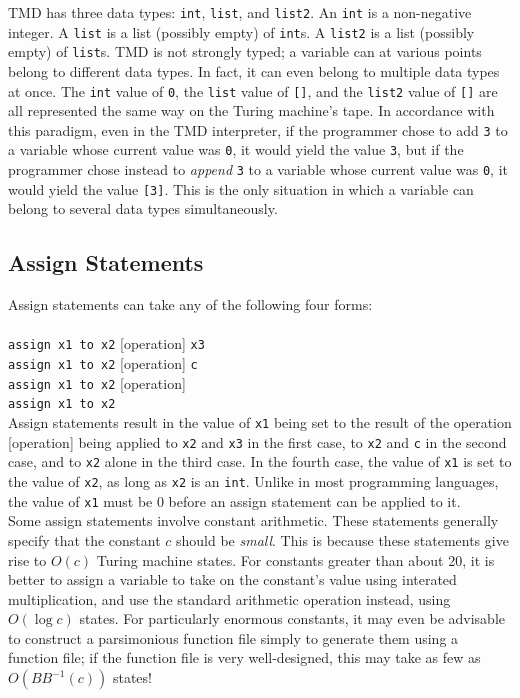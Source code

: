 TMD has three data types: \texttt{int}, \texttt{list}, and \texttt{list2}. An \texttt{int} is a non-negative integer. A \texttt{list} is a list (possibly empty) of \texttt{int}s. A \texttt{list2} is a list (possibly empty) of \texttt{list}s. TMD is not strongly typed; a variable can at various points belong to different data types. In fact, it can even belong to multiple data types at once. The \texttt{int} value of \texttt{0}, the \texttt{list} value of \texttt{[]}, and the \texttt{list2} value of \texttt{[]} are all represented the same way on the Turing machine's tape. In accordance with this paradigm, even in the TMD interpreter, if the programmer chose to add \texttt{3} to a variable whose current value was \texttt{0}, it would yield the value \texttt{3}, but if the programmer chose instead to \emph{append} \texttt{3} to a variable whose current value was \texttt{0}, it would yield the value \texttt{[3]}. This is the only situation in which a variable can belong to several data types simultaneously.

\subsection{Assign Statements}

Assign statements can take any of the following four forms: \\ \\
\texttt{assign x1 to x2} [operation] \texttt{x3} \\ 
\texttt{assign x1 to x2} [operation] \texttt{c} \\
\texttt{assign x1 to x2} [operation] \\
\texttt{assign x1 to x2} \\

Assign statements result in the value of \texttt{x1} being set to the result of the operation [operation] being applied to \texttt{x2} and \texttt{x3} in the first case, to \texttt{x2} and \texttt{c} in the second case, and to \texttt{x2} alone in the third case. In the fourth case, the value of \texttt{x1} is set to the value of \texttt{x2}, as long as \texttt{x2} is an \texttt{int}. Unlike in most programming languages, the value of \texttt{x1} must be 0 before an assign statement can be applied to it. \\

Some assign statements involve constant arithmetic. These statements generally specify that the constant $c$ should be \emph{small}. This is because these statements give rise to $O(c)$ Turing machine states. For constants greater than about 20, it is better to assign a variable to take on the constant's value using interated multiplication, and use the standard arithmetic operation instead, using $O(\log c)$ states. For particularly enormous constants, it may even be advisable to construct a parsimonious function file simply to generate them using a function file; if the function file is very well-designed, this may take as few as $O(BB^{-1}(c))$ states! \\

